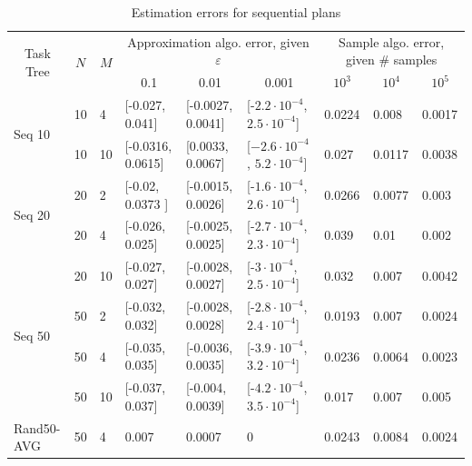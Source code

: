 \documentclass[review]{elsarticle}
\begin{document}
\begin{table}[tbh!]
	{\footnotesize
		\begin{tabular}{|l|l|l|| p{1.1cm}|p{1.1cm}|p{1.4cm}||p{0.9cm}|p{0.9cm}|p{0.9cm}|}
			\hline
			\multicolumn{1}{|c|}{\multirow{2}{*}{Task Tree}} & \multicolumn{1}{c|}{\multirow{2}{*}{$N$}} & \multicolumn{1}{c|}{\multirow{2}{*}{$M$}} & \multicolumn{3}{c|}{Approximation algo. error, given $\varepsilon$} & \multicolumn{3}{c|}{Sample algo. error, given \# samples} \\ \cline{4-9} 
			\multicolumn{1}{|c|}{} & \multicolumn{1}{c|}{} & \multicolumn{1}{c|}{} & \multicolumn{1}{c|}{0.1} & \multicolumn{1}{c|}{0.01} & \multicolumn{1}{c|}{0.001} & \multicolumn{1}{c|}{$10^{3}$} & \multicolumn{1}{c|}{$10^{4}$} & \multicolumn{1}{c|}{$10^{5}$} \\ \hline \hline
			\multirow{2}{*}{Seq 10} & 10 & 4 & [-0.027, 0.041] & [-0.0027, 0.0041] & [-$2.2 {\cdot} 10^{-4}$, $2.5 {\cdot} 10^{-4}$] & 0.0224 & 0.008 & 0.0017  \\ \cline{2-9} 
			& 10 & 10 &[-0.0316, 0.0615]  & [0.0033, 0.0067] & [$-2.6 {\cdot} 10^{-4}$, $5.2 {\cdot} 10^{-4}$] & 0.027 & 0.0117 & 0.0038  \\ \hline 
			\multirow{2}{*}{Seq 20} & 20 & 2 & [-0.02, 0.0373 ] & [-0.0015, 0.0026] & [-$1.6 {\cdot} 10^{-4}$, $2.6 {\cdot} 10^{-4}$]  & 0.0266 & 0.0077 &  0.003   \\ \cline{2-9} 
			& 20 & 4 & [-0.026, 0.025] & [-0.0025, 0.0025]  & [-$2.7{\cdot} 10^{-4}$, $2.3 {\cdot} 10^{-4}$] & 0.039 & 0.01 & 0.002 \\ \cline{2-9} 
			& 20 & 10   & [-0.027, 0.027] & [-0.0028, 0.0027] & [-$3 {\cdot} 10^{-4}$, $2.5 {\cdot} 10^{-4}$] & 0.032 & 0.007 & 0.0042  \\ \hline
			\multirow{2}{*}{Seq 50} & 50 & 2 & [-0.032, 0.032] & [-0.0028, 0.0028] & [-$2.8 {\cdot} 10^{-4}$, $2.4 {\cdot} 10^{-4}$]  & 0.0193 & 0.007 & 0.0024  \\ \cline{2-9}  
			& 50 & 4  & [-0.035, 0.035]  & [-0.0036, 0.0035] &[-$3.9 {\cdot} 10^{-4}$, $3.2 {\cdot} 10^{-4}$]  & 0.0236 & 0.0064 & 0.0023 \\ \cline{2-9}  
			& 50 & 10  & [-0.037, 0.037] & [-0.004, 0.0039] & [-$4.2 {\cdot} 10^{-4}$, $3.5 {\cdot} 10^{-4}$] & 0.017 & 0.007  & 0.005  \\ \hline
			\multirow{1}{*}{Rand50-AVG} & 50 & 4 & 0.007 & 0.0007 &  0 & 0.0243 & 0.0084 & 0.0024 \\   \hline
			
		\end{tabular}
		\caption{Estimation errors for sequential plans}
		\label{tab:errors2}
	}
\end{table}
\end{document}

